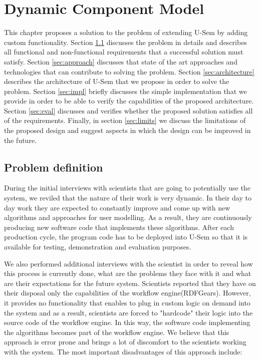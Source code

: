 
\chapter{Dynamic Component Model}

This chapter proposes a solution to the problem of extending U-Sem by adding custom functionality. Section \ref{sec:problemDef} discusses the problem in details and describes all functional and non-functional requirements that a successful solution must satisfy. Section \ref{sec:approach} discusses that state of the art approaches and technologies that  can contribute to solving the problem. Section \ref{sec:architecture} describes the architecture of U-Sem that we propose in order to solve the problem. Section \ref{sec:impl} briefly discusses the simple implementation that we provide in order to be able to verify the capabilities of the proposed architecture. Section \ref{sec:eval} discusses and verifies whether the proposed solution satisfies all of the requirements. Finally, in section \ref{sec:limits} we discuss the limitations of the proposed design and suggest aspects in which the design can be improved in the future.


\section{Problem definition}
\label{sec:problemDef}

During the initial interviews with scientists that are going to potentially use the system, we reviled that the nature of their work is very dynamic. In their day to day work they are expected to constantly improve and come up with new algorithms and approaches for user modelling. As a result, they are continuously producing new software code that implements these algorithms. After each production cycle, the program code has to be deployed into U-Sem so that it is available for testing, demonstration and evaluation purposes.

We also performed additional interviews with the scientist in order to reveal how this process is currently done, what are the problems they face with it and what are their expectations for the future system. Scientists reported that they have on their disposal only the capabilities of the workflow engine(RDFGears). However, it provides no functionality that enables to plug in custom logic on demand into the system and as a result, scientists are forced to "hardcode" their logic into the source code of the workflow engine. In this way, the software code implementing the algorithms becomes part of the workflow engine. We believe that this approach is error prone and brings a lot of discomfort to the scientists working with the system. The most important disadvantages of this approach include:

